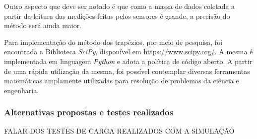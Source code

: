Outro aspecto que deve ser notado é que como a massa de dados coletada a partir da leitura das medições feitas pelos sensores é grande, a
precisão do método será ainda maior.

Para implementação do método dos trapézios, por meio de pesquisa, foi encontrada a Biblioteca \textit{SciPy}, disponível em \href{https://www.scipy.org/}{https://www.scipy.org/}. A mesma é implementada em linguagem \textit{Python} e adota a política de código aberto. A partir de uma rápida utilização da mesma, foi possível contemplar diversas ferramentas matemáticas amplamente utilizadas para resolução de problemas da ciência e engenharia.


\subsubsection{\textbf{Alternativas propostas e testes realizados}}


FALAR DOS TESTES DE CARGA REALIZADOS COM A SIMULAÇÃO
